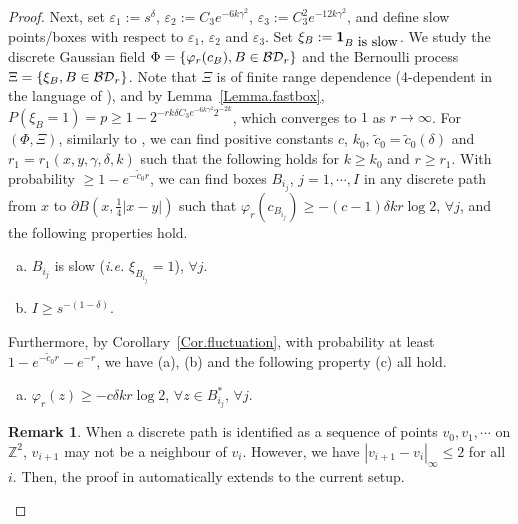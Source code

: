 \documentclass[11pt]{article}
\theoremstyle{definition}
\newtheorem{remark}[theorem]{Remark}
\def \BD {{\cal BD}}
\def \e {\varepsilon}
\def \d {\delta}
\def \Z {{\mathbb{Z}}}
\begin{document}
\begin{proof}
Next, set $\e_1 := s^\d $, $\e_2 := C_3 e^{- 6 k \gamma^2}$, $\e_3 := C_3^2 e^{- 12 k \gamma^2}$, and define slow points/boxes with respect to $\e_1$, $\e_2$ and $\e_3$. Set
$\xi_B : = {\bf 1}_{B \ \mbox{is slow}}$. We study the discrete Gaussian field $\Phi = \{ \varphi_r (c_B), B \in \BD_r \}$ and the Bernoulli process $\Xi = \{ \xi_B, B \in \BD_r \}$.
Note that $\Xi$ is of finite range dependence (4-dependent in the language
of  \cite{DZ15}), and by Lemma~\ref{Lemma.fastbox},
$P(\xi_B = 1) = p \ge 1 - 2^{- r k \d C_3 e^{- 6 k \gamma^2} 2^{- 2k}}$,
which converges to $1$ as $r \to \infty$.
For $(\Phi, \Xi)$, similarly to \cite[Theorem~1.5]{DZ15}, we can find positive constants $c$,
$k_0$, $\tilde c_0 = \tilde c_0 (\d)$ and
$r_1 = r_1 (x,y,\gamma, \d, k)$ such that the following holds for
$k \ge k_0$ and $r \ge r_1$. With probability
$\ge 1 - e^{- \tilde c_0 r}$, we can find boxes $B_{i_j}$, $j=1, \cdots, I$ in any discrete path from $x$ to $\partial B(x, \frac 1 4 |x-y|)$ such that $\varphi_r (c_{B_{i_j}}) \ge - (c-1) \d k r \log 2$, $\forall j$, and the following properties hold.
 \begin{enumerate}[(a)]
\item $B_{i_j}$ is slow ({\em i.e.} $\xi_{B_{i_j}} = 1$), $\forall j$.
\item $I \ge s^{-(1-\d)}$.
 \end{enumerate}

Furthermore, by Corollary~\ref{Cor.fluctuation}, with probability at least $1 - e^{-\tilde c_0 r} -e^{-r}$, we have (a), (b) and the following property (c) all hold.
 \begin{enumerate}[(c)]
\item  $\varphi_r (z) \ge - c \d k r \log 2$, $\forall z \in B_{i_j}^{*}$, $\forall j$.
\end{enumerate}

 \begin{remark}
When a discrete path is identified as a sequence of points $v_0, v_1, \cdots$ on $\Z^2$, $v_{i+1}$ may not be a neighbour of $v_i$. However, we have $|v_{i+1} - v_i|_\infty \le 2$ for all $i$. Then, the proof in \cite[Theorem~1.5]{DZ15} automatically extends to the current setup.
 \end{remark}


\end{proof}
\end{document}
